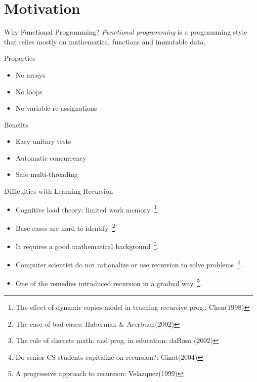 \section{Motivation}

\begin{frame}{Why Functional Programming?}
  \emph{Functional programming} is a programming style that relies
  mostly on mathematical functions and immutable data.
  \begin{block}{Properties}
    \begin{itemize}
    \item No arrays
    \item No loops
    \item No variable re-assignations
    \end{itemize}
  \end{block}
  \begin{block}{Benefits}
    \begin{itemize}
    \item Easy unitary tests
    \item Automatic concurrency
    \item Safe multi-threading
    \end{itemize}
  \end{block}
\end{frame}

\begin{frame}{Difficulties with Learning Recursion}
  \begin{itemize}
  \item Cognitive load theory: limited work memory~\footnote{The effect of
    dynamic copies model in teaching recursive prog.: Chen(1998)}.
  \item Base cases are hard to identify~\footnote{The case of bad cases: Haberman
    \& Averbuch(2002)}.
  \item It requires a good mathematical background~\footnote{The role of
    discrete math. and prog. in education: daRosa (2002)}.
  \item Computer scientist do not rationalize or use recursion to solve
    problems~\footnote{Do senior CS students capitalize on recursion?: Ginat(2004)}.
  \item One of the remedies introduced recursion in a gradual
    way~\footnote{A progressive approach to recursion: Velazquez(1999)}.
  \end{itemize}
\end{frame}


